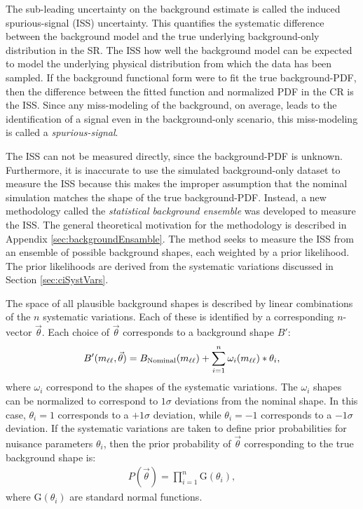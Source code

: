 The sub-leading uncertainty on the background estimate is called the induced spurious-signal (ISS) uncertainty.
This quantifies the systematic difference between the background model and the true underlying background-only distribution in the SR.
The ISS how well the background model can be expected to model the underlying physical distribution from which the data has been sampled.
If the background functional form were to fit the true background-PDF, then the difference between the fitted function and normalized PDF in the CR is the ISS.
Since any miss-modeling of the background, on average, leads to the identification of a signal even in the background-only scenario, this miss-modeling is called a \emph{spurious-signal}.

The ISS can not be measured directly, since the background-PDF is unknown.
Furthermore, it is inaccurate to use the simulated background-only dataset to measure the ISS because this makes the improper assumption that the nominal simulation matches the shape of the true background-PDF.
Instead, a new methodology called the \emph{statistical background ensemble} was developed to measure the ISS.
The general theoretical motivation for the methodology is described in Appendix \ref{sec:backgroundEnsamble}.
The method seeks to measure the ISS from an ensemble of possible background shapes, each weighted by a prior likelihood.
The prior likelihoods are derived from the systematic variations discussed in Section \ref{sec:ciSystVars}.

The space of all plausible background shapes is described by linear combinations of the $n$ systematic variations.
Each of these is identified by a corresponding $n$-vector $\vec{\theta}$.
Each choice of $\vec{\theta}$ corresponds to a background shape $B'$:
\begin{equation}\begin{split}
    B'(m_{\ell\ell},\vec{\theta}) = B_\text{Nominal}(m_{\ell\ell}) + \sum_{i=1}^n \omega_i(m_{\ell\ell})*\theta_i,
\end{split}\end{equation} 
where $\omega_i$ correspond to the shapes of the systematic variations.
The $\omega_i$ shapes can be normalized to correspond to $1\sigma$ deviations from the nominal shape.
In this case, $\theta_i=1$ corresponds to a $+1\sigma$ deviation, while $\theta_i=-1$ corresponds to a $-1\sigma$ deviation.
If the systematic variations are taken to define prior probabilities for nuisance parameters $\theta_i$, then the prior probability of $\vec{\theta}$ corresponding to the true background shape is:
\begin{equation}\begin{split}
    P(\vec{\theta})=\prod_{i=1}^n \text{G}(\theta_i),
\end{split}\end{equation} 
where $\text{G}(\theta_i)$ are standard normal functions.

